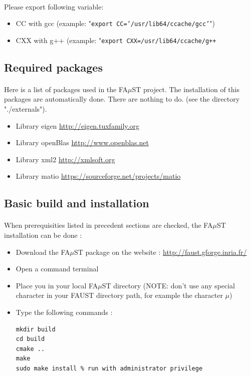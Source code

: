 \paragraph{}Please export following variable:
\begin{itemize}
\item CC with gcc (example: "\texttt{export CC='/usr/lib64/ccache/gcc'}") 
\item CXX with g++ (example: "\texttt{export CXX=/usr/lib64/ccache/g++}
\end{itemize}

\subsection{Required packages}\label{sec:RequiredPackages}

\paragraph{}Here is a list of packages used in the FA$\mu$ST project. The installation of this packages are automatically done. There are nothing to do. (see the directory "./externals").
\begin{itemize}
\item Library eigen \url{http://eigen.tuxfamily.org}
\item Library openBlas \url{http://www.openblas.net}
\item Library xml2 \url{http://xmlsoft.org}
\item Library matio \url{https://sourceforge.net/projects/matio}
\end{itemize}

\subsection{Basic build and installation}\label{sec:UnixBuildInstall}
\paragraph{}When prerequisities listed in precedent sections are checked, the FA$\mu$ST installation can be done : 

\begin{itemize}
\item Download the FA$\mu$ST package on the website :  \url{http://faust.gforge.inria.fr/}
\item Open a command terminal
\item Place you in your local FA$\mu$ST directory (NOTE: don't use any special character in your FAUST directory path, for example the character $\mu$)
\item Type the following commands : 

\begin{lstlisting}
mkdir build
cd build
cmake ..
make
sudo make install % run with administrator privilege
\end{lstlisting}
\end{itemize}

